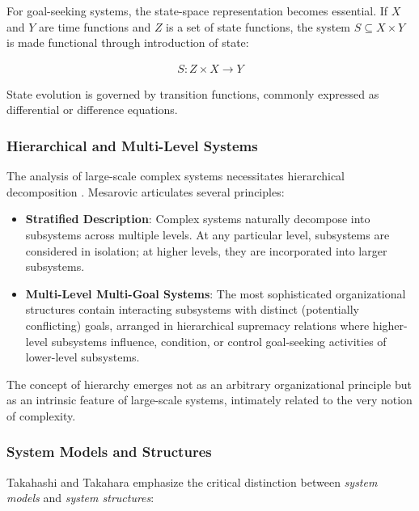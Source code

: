 For goal-seeking systems, the state-space representation becomes essential. If $X$ and $Y$ are time functions and $Z$ is a set of state functions, the system $S \subseteq X \times Y$ is made functional through introduction of state:

\begin{align*}
S: Z \times X \to Y
\end{align*}

State evolution is governed by transition functions, commonly expressed as differential or difference equations.

\subsubsection{Hierarchical and Multi-Level Systems}

The analysis of large-scale complex systems necessitates hierarchical decomposition \citep{Mesarovic1972}. Mesarovic articulates several principles:

\begin{itemize}
\item \textbf{Stratified Description}: Complex systems naturally decompose into subsystems across multiple levels. At any particular level, subsystems are considered in isolation; at higher levels, they are incorporated into larger subsystems.

\item \textbf{Multi-Level Multi-Goal Systems}: The most sophisticated organizational structures contain interacting subsystems with distinct (potentially conflicting) goals, arranged in hierarchical supremacy relations where higher-level subsystems influence, condition, or control goal-seeking activities of lower-level subsystems.
\end{itemize}

The concept of hierarchy emerges not as an arbitrary organizational principle but as an intrinsic feature of large-scale systems, intimately related to the very notion of complexity.

\subsubsection{System Models and Structures}

Takahashi and Takahara \citep{Takahashi1995} emphasize the critical distinction between \emph{system models} and \emph{system structures}:

